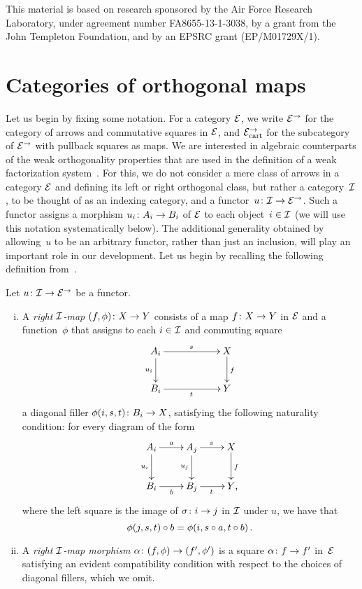 \documentclass[reqno,10pt,a4paper,oneside,draft]{amsart}
\begin{document}
This material is based on research sponsored by the Air Force Research Laboratory, under agreement number FA8655-13-1-3038, by a grant from the John Templeton Foundation, and by an EPSRC grant (EP/M01729X/1).





\section{Categories of orthogonal maps}
\label{sec:ortf}

Let us begin by fixing some notation. For a category $\catE$, we write $\cal{E}^\to$ for the category of arrows and commutative squares in $\cal{E}$, and $\cal{E}^\to_{\cart}$ for the
subcategory of $\cal{E}^\to$ with pullback squares as maps. 
We are interested in algebraic counterparts of the weak orthogonality properties that are used in the definition of a weak factorization system~\cite{bousfield-wfs}. For this, we do not consider a mere class of arrows in a category $\catE$ and defining its left or right orthogonal class, but rather a category~$\cal{I}$, to be thought of as an indexing category, and a functor~$u \co \cal{I} \to \catE^\to$.
Such a functor assigns a morphism $u_i \co A_i \to B_i$ of $\catE$ to each object~$i \in \cal{I}$ (we will use this notation systematically below).
The additional generality obtained by allowing~$u$ to be an arbitrary functor, rather than just an inclusion, will play an important role in our development.
Let us begin by recalling the following definition from~\cite{garner:small-object-argument}.

\begin{definition} \label{def:right-map}
Let $u \co \cal{I} \to \catE^\to$ be a functor.
\begin{enumerate}[(i)]
\item A \emph{right $\cal{I}$-map} $(f, \phi) \co X \to Y$ consists of a map $f \co X \to Y$ in $\catE$ and a
 function~$\phi$ that assigns to each $i \in \cal{I}$ and commuting square
\[
\xymatrix@C=2cm{
  A_i
  \ar[r]^{s}
  \ar[d]_{u_i}
&
  X
  \ar[d]^f
\\
  B_i
  \ar[r]_{t}
&
  Y
}
\]
a diagonal filler $\phi(i,s, t) \co B_i \to X$, satisfying the following naturality condition: for every diagram of the form
\[
\xymatrix{
  A_i
  \ar[r]^{a}
  \ar[d]_{u_i}
&
  A_j
  \ar[r]^{s}
  \ar[d]_{u_j}
&
  X
  \ar[d]^f
\\
  B_i
  \ar[r]_{b}
&
  B_j
  \ar[r]_{t}
&
  Y
\rlap{,}}
\]
where the left square is the image of $\sigma \co i \to j$ in $\cal{I}$ under $u$, we have that
\[
  \phi(j, s, t) \cc b = \phi(i, s \cc a, t \cc b) \, .
\]
\item A \emph{right $\cal{I}$-map morphism} $\alpha \co (f, \phi) \to (f', \phi')$ is a square $\alpha \co f \to f'$ in~$\catE$ satisfying an evident compatibility condition with respect to the choices of diagonal fillers, which we omit.
\end{enumerate}
\end{definition}
\end{document}
